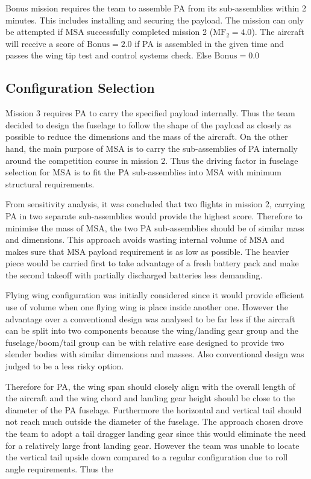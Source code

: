 Bonus mission requires the team to assemble PA from its sub-assemblies within 2 minutes. This includes installing and securing the payload. The mission can only be attempted if MSA successfully completed mission 2 ($\text{MF}_{2} = 4.0$). The aircraft will receive a score of $\text{Bonus} = 2.0$ if PA is assembled in the given time and passes the wing tip test and control systems check. Else $\text{Bonus} = 0.0$




\subsection{Configuration Selection}


Mission 3 requires PA to carry the specified payload internally. Thus the team decided to design the fuselage to follow the shape of the payload as closely as possible to reduce the dimensions and the mass of the aircraft. On the other hand, the main purpose of MSA is to carry the sub-assemblies of PA internally around the competition course in mission 2. Thus the driving factor in fuselage selection for MSA is to fit the PA sub-assemblies into MSA with minimum structural requirements.

From sensitivity analysis, it was concluded that two flights in mission 2, carrying PA in two separate sub-assemblies would provide the highest score. Therefore to minimise the mass of MSA, the two PA sub-assemblies should be of similar mass and dimensions. This approach avoids wasting internal volume of MSA and makes sure that MSA payload requirement is as low as possible. The heavier piece would be carried first to take advantage of a fresh battery pack and make the second takeoff with partially discharged batteries less demanding.

Flying wing configuration was initially considered since it would provide efficient use of volume when one flying wing is place inside another one. However the advantage over a conventional design was analysed to be far less if the aircraft can be split into two components because the wing/landing gear group and the fuselage/boom/tail group can be with relative ease designed to provide two slender bodies with similar dimensions and masses. Also conventional design was judged to be a less risky option.

Therefore for PA, the wing span should closely align with the overall length of the aircraft and the wing chord and landing gear height should be close to the diameter of the PA fuselage. Furthermore the horizontal and vertical tail should not reach much outside the diameter of the fuselage. The approach chosen drove the team to adopt a tail dragger landing gear since this would eliminate the need for a relatively large front landing gear. However the team was unable to locate the vertical tail upside down compared to a regular configuration due to roll angle requirements. Thus the 
